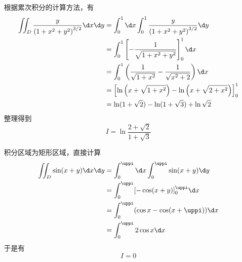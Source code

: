 \begin{solution}

    根据累次积分的计算方法，有
    \begin{equation}
        \begin{aligned}
            \iint_{D} \frac{y}{\left(1+x^{2}+y^{2}\right)^{3 / 2}} \d x \d y & = \int_{0}^{1} \d x \int_{0}^{1} \frac{y}{\left(1+x^{2}+y^{2}\right)^{3 / 2}} \d y                     \\
                                                                             & = \int_{0}^{1} \left[ -\frac{1}{\sqrt{1+x^{2}+y^{2}}} \right]_{0}^{1} \d x                             \\
                                                                             & = \int_{0}^{1} \left( \frac{1}{\sqrt{1+x^{2}}} - \frac{1}{\sqrt{x^{2}+2}} \right) \d x                 \\
                                                                             & = \left[ \ln \left( x + \sqrt{1+x^{2}} \right) - \ln \left( x + \sqrt{2+x^{2}} \right) \right]_{0}^{1} \\
                                                                             & = \ln (1+\sqrt{2}) - \ln (1+\sqrt{3}) + \ln \sqrt{2}
        \end{aligned}
    \end{equation}
    整理得到
    \begin{equation}
        I = \boxed{\ln \frac{2+\sqrt{2}}{1+\sqrt{3}}}
    \end{equation}


    积分区域为矩形区域，直接计算
    \begin{equation}
        \begin{aligned}
            \iint_{D} \sin (x+y) \d x \d y & = \int_{0}^{\uppi} \d x \int_{0}^{\uppi} \sin (x+y) \d y \\
                                           & = \int_{0}^{\uppi} [-\cos (x+y)]_{0}^{\uppi} \d x        \\
                                           & = \int_{0}^{\uppi} (\cos x - \cos (x+\uppi)) \d x        \\
                                           & = \int_{0}^{\uppi} 2 \cos x \d x
        \end{aligned}
    \end{equation}
    于是有
    \begin{equation}
        I = \boxed{0}
    \end{equation}


\end{solution}
